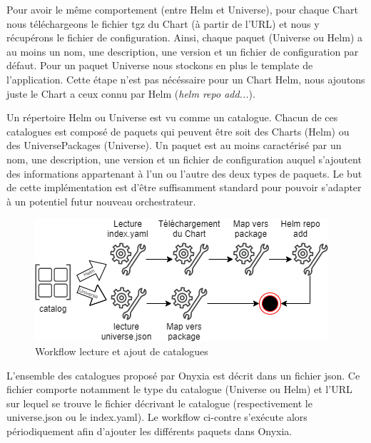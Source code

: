 \documentclass[11pt,fleqn]{book} %
\begin{document}
\vspace{-0.5cm}
Pour avoir le même comportement (entre Helm et Universe), pour chaque Chart nous téléchargeons le fichier tgz du Chart (à partir de l'URL) et nous y récupérons le fichier de configuration. Ainsi, chaque paquet (Universe ou Helm) a au moins un nom, une description, une version et un fichier de configuration par défaut. Pour un paquet Universe nous stockons en plus le template de l'application. Cette étape n'est pas nécéssaire pour un Chart Helm, nous ajoutons juste le Chart a ceux connu par Helm (\textit{helm repo add...}).
\vspace{-0.5cm}
\begin{interrupt}
Un répertoire Helm ou Universe est vu comme un catalogue. Chacun de ces catalogues est composé de paquets qui peuvent être soit des Charts (Helm) ou des UniversePackages (Universe). Un paquet est au moins caractérisé par un nom, une description, une version et un fichier de configuration auquel s'ajoutent des informations appartenant à l'un ou l'autre des deux types de paquets. Le but de cette implémentation est d'être suffisamment standard pour pouvoir s'adapter à un potentiel futur nouveau orchestrateur.
\end{interrupt}

\begin{figure}
\renewcommand{\figurename}{Diagramme}
\includegraphics[scale=0.6]{Pictures/onyxia/workflow-catalog.png}
\caption{Workflow lecture et ajout de catalogues \newline}
\end{figure}
\vspace{-0.5cm}
L'ensemble des catalogues proposé par Onyxia est décrit dans un fichier json. Ce fichier comporte notamment le type du catalogue (Universe ou Helm) et l'URL sur lequel se trouve le fichier décrivant le catalogue (respectivement le universe.json ou le index.yaml). Le workflow ci-contre s'exécute alors périodiquement afin d'ajouter les différents paquets dans Onyxia.
\end{document}
